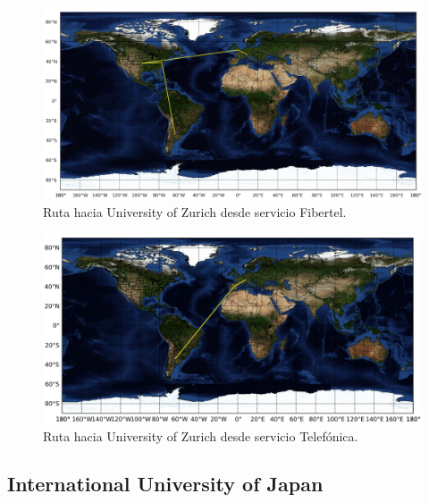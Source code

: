 \documentclass[10pt, a4paper]{article}
\begin{document}
\begin{figure}[H] %
\begin{center}
\includegraphics[width=400pt]{../imgs/map-uzh.png}
\caption{Ruta hacia University of Zurich desde servicio Fibertel.}
\end{center}
\end{figure}

\begin{figure}[H] %
\begin{center}
\includegraphics[width=400pt]{../imgs/map-uzh(telef).png}
\caption{Ruta hacia University of Zurich desde servicio Telefónica.}
\end{center}
\end{figure}



\subsection{International University of Japan}
\end{document}
